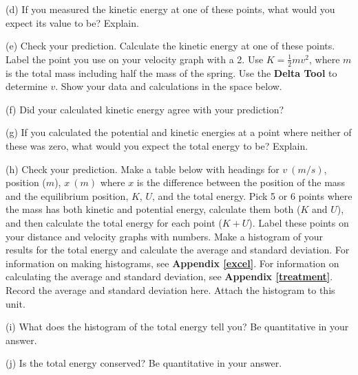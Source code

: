(d) If you measured the kinetic energy at one of these points, what would you
expect its value to be? Explain.
\vspace{20mm}

\newpage
(e) Check your prediction. Calculate the kinetic energy at one of these points.
Label the point you use on your velocity graph with a 2. Use 
$K = \frac{1}{2} mv^{2}$, where $m$ is the total mass including half the mass of 
the spring. Use the \textbf{Delta Tool} to determine $v$. Show your data and 
calculations in the space below.
\vspace{20mm}

(f) Did your calculated kinetic energy agree with your prediction?
\vspace{15mm}

(g) If you calculated the potential and kinetic energies at a point where 
neither of these was zero, what would you expect the total energy to be? 
Explain.
\vspace{20mm}

(h) Check your prediction. Make a table below with headings for $v~(m/s)$, 
position ($m$), $x~(m)$ where $x$ is the difference between the position
of the mass and the equilibrium position, $K$, $U$, and the total energy.
Pick 5 or 6 points where the mass has both kinetic and
potential energy, calculate them both ($K$ and $U$), and then calculate the 
total energy for each point ($K+U$). Label these points on your distance
and velocity graphs with numbers. 
Make a histogram of your results for the total energy and calculate the 
average and standard deviation.
For information on making histograms, see \textbf{Appendix \ref{excel}}. For information 
on calculating the average and standard deviation, see \textbf{Appendix \ref{treatment}}. 
Record the average and standard deviation here.
Attach the histogram to this unit.
\vspace{60mm}

(i) What does the histogram of the total energy tell you? Be quantitative in 
your answer.
\vspace{20mm}

(j) Is the total energy conserved?  Be quantitative in your answer.

